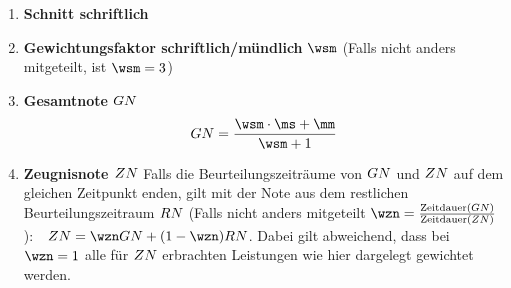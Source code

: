 \begin{enumerate}[label=\textbf{(\arabic*)}, align=left, leftmargin=*]
{\[	\,\,\,\,
	\wvzwei =
	\begin{cases}
		0 & \text{für }  \wdis \geq 1 \\
		\mhalf - \left | \wth \right | & \text{für }    \wdis < 1 \text{ und \defsn} \\
		\mhalf + \left | \wth \right | & \text{für }    \wdis < 1 \text{ und \defsnp} \\
	\end{cases}
	\]
	\vspace{-0.2cm}
	\[
	\wvdrei =
	\begin{cases}
		0 & \text{für } \wdis \geq 1\\
		\left | \frac{\wnull}{\wth}  \right | & \text{ansonsten}\\
	\end{cases}
	\,\hspace{0.5cm}\,
	\wvvier =
	\begin{cases}
		0 & \text{für }  \wdis \geq 1 \\
		\frac{\nveins \cdot \wveins + \nvo \cdot \mseins + \nvzwei \cdot \wvzwei}{\nvg} & \text{ansonsten}\\
	\end{cases}
	\]
	}
	\item \textbf{Schnitt schriftlich}
	\item \textbf{Gewichtungsfaktor schriftlich/mündlich} $\wsm$ (Falls nicht anders mitgeteilt, ist $\wsm=3$)
	\item \textbf{Gesamtnote $GN$}
	\vspace*{-0.5cm}
	\[
	\defgn = \frac{\wsm \cdot \ms + \mm}{\wsm+1}
	\]
	\item \textbf{Zeugnisnote $ZN$}
	{ \thisfontsize Falls die Beurteilungszeiträume von $GN$ und $ZN$ auf dem gleichen Zeitpunkt enden, gilt mit der Note aus dem restlichen Beurteilungszeitraum $RN$ (Falls nicht anders mitgeteilt $\wzn=\frac{\mathrm{Zeitdauer}(\defgn) }{\mathrm{Zeitdauer}( \defzn)}$): \,\,
	$	\defzn = \wzn \defgn + (1 - \wzn) \defrn$. Dabei gilt abweichend, dass bei $\wzn=1$ alle für $ZN$ erbrachten Leistungen wie hier dargelegt gewichtet werden. }
\end{enumerate}

\renewcommand\refname{\footnotesize Quellen}
\renewcommand{\bibname}{Quellen}

\vfill


\begingroup
\tiny
\setlength{\bibsep}{0pt}


\endgroup
{}